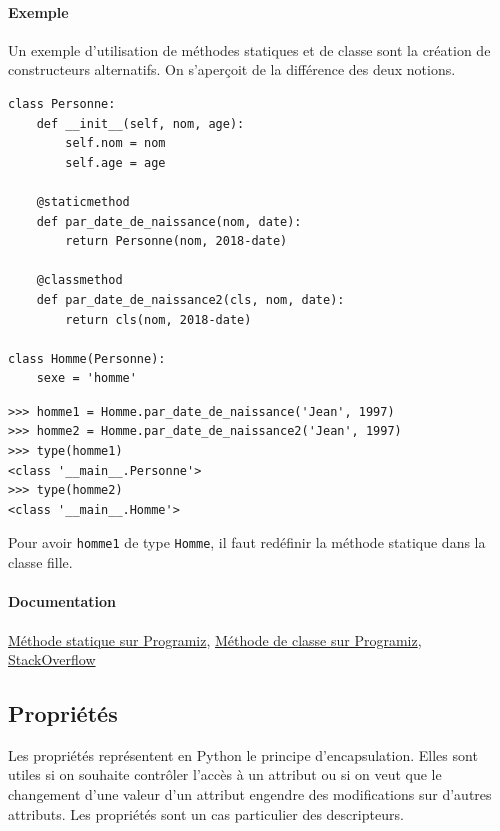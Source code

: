 \documentclass[a4paper, 10pt]{article}
\newcommand{\code}[1]{{\small\texttt{#1}}}
\begin{document}
\paragraph{Exemple} Un exemple d'utilisation de méthodes statiques et de classe sont la création de constructeurs alternatifs. On s'aperçoit de la différence des deux notions.
\begin{verbatim}
class Personne:
    def __init__(self, nom, age):
        self.nom = nom
        self.age = age
    
    @staticmethod
    def par_date_de_naissance(nom, date):
        return Personne(nom, 2018-date)

    @classmethod
    def par_date_de_naissance2(cls, nom, date):
        return cls(nom, 2018-date)

class Homme(Personne):
    sexe = 'homme'
\end{verbatim}
\begin{Verbatim}[frame=single, fontsize=\footnotesize]
>>> homme1 = Homme.par_date_de_naissance('Jean', 1997)
>>> homme2 = Homme.par_date_de_naissance2('Jean', 1997)
>>> type(homme1)
<class '__main__.Personne'>
>>> type(homme2)
<class '__main__.Homme'>
\end{Verbatim}

Pour avoir \code{homme1} de type \code{Homme}, il faut redéfinir la méthode statique dans la classe fille.

\paragraph{Documentation} \href{https://www.programiz.com/python-programming/methods/built-in/staticmethod}{Méthode statique sur Programiz}, \href{https://www.programiz.com/python-programming/methods/built-in/classmethod}{Méthode de classe sur Programiz}, \href{https://stackoverflow.com/questions/136097/what-is-the-difference-between-staticmethod-and-classmethod-in-python/1669524#1669524}{StackOverflow}


\subsection{Propriétés}
 Les propriétés représentent en Python le principe d'encapsulation. Elles sont utiles si on souhaite contrôler l'accès à un attribut ou si on veut que le changement d'une valeur d'un attribut engendre des modifications sur d'autres attributs. Les propriétés sont un cas particulier des descripteurs.
 
\end{document}
